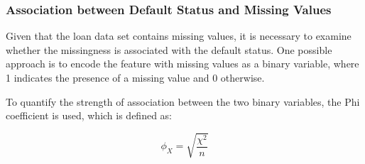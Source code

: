 \subsubsection{Association between Default Status and Missing Values}
\label{subsubsec:target-na-ass}

Given that the loan data set contains missing values, it is necessary to examine whether the missingness is associated with the default status. One possible approach is to encode the feature with missing values as a binary variable, where 1 indicates the presence of a missing value and 0 otherwise.

To quantify the strength of association between the two binary variables, the Phi coefficient is used, which is defined as:

\begin{equation}\label{eq}
\phi_{X} = \sqrt{\frac{\chi^{2}}{n}}
\end{equation}

